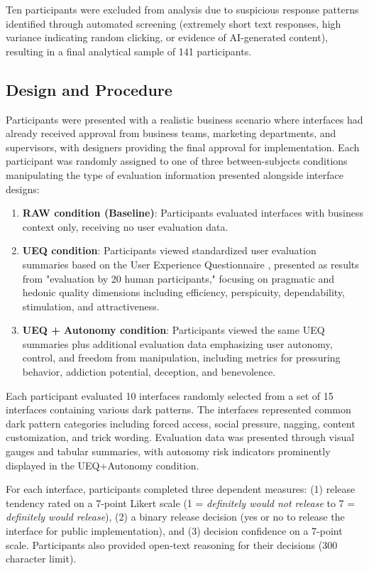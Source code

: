 Ten participants were excluded from analysis due to suspicious response patterns identified through automated screening (extremely short text responses, high variance indicating random clicking, or evidence of AI-generated content), resulting in a final analytical sample of 141 participants.

\subsection{Design and Procedure}

Participants were presented with a realistic business scenario where interfaces had already received approval from business teams, marketing departments, and supervisors, with designers providing the final approval for implementation. Each participant was randomly assigned to one of three between-subjects conditions manipulating the type of evaluation information presented alongside interface designs:

\begin{enumerate}
\item \textbf{RAW condition (Baseline)}: Participants evaluated interfaces with business context only, receiving no user evaluation data.
\item \textbf{UEQ condition}: Participants viewed standardized user evaluation summaries based on the User Experience Questionnaire \cite{laugwitz2008construction}, presented as results from "evaluation by 20 human participants," focusing on pragmatic and hedonic quality dimensions including efficiency, perspicuity, dependability, stimulation, and attractiveness.
\item \textbf{UEQ + Autonomy condition}: Participants viewed the same UEQ summaries plus additional evaluation data emphasizing user autonomy, control, and freedom from manipulation, including metrics for pressuring behavior, addiction potential, deception, and benevolence.
\end{enumerate}

Each participant evaluated 10 interfaces randomly selected from a set of 15 interfaces containing various dark patterns. The interfaces represented common dark pattern categories including forced access, social pressure, nagging, content customization, and trick wording. Evaluation data was presented through visual gauges and tabular summaries, with autonomy risk indicators prominently displayed in the UEQ+Autonomy condition.

For each interface, participants completed three dependent measures: (1) release tendency rated on a 7-point Likert scale (1 = \textit{definitely would not release} to 7 = \textit{definitely would release}), (2) a binary release decision (yes or no to release the interface for public implementation), and (3) decision confidence on a 7-point scale. Participants also provided open-text reasoning for their decisions (300 character limit).

